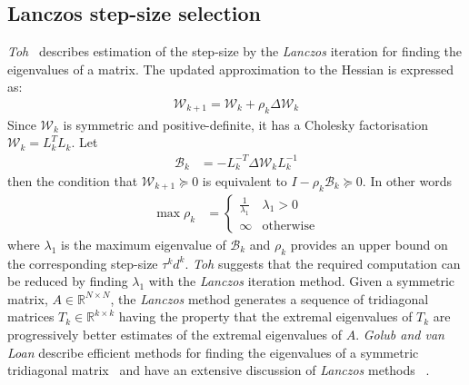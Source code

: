 \documentclass[a4paper,twoside,10pt,english]{report}
\begin{document}
\subsection{\label{sub:Lanczos-update}Lanczos step-size selection}
\emph{Toh}~\cite{Toh_NoteOnStepLengthsSemidefiniteProgramming} describes
estimation of the step-size by the \emph{Lanczos} iteration for
finding the eigenvalues of a matrix. The updated approximation to the Hessian
is expressed as:
\begin{align*}
\mathcal{W}_{k+1}=\mathcal{W}_{k}+\rho_{k}\Delta{}\mathcal{W}_{k}
\end{align*}
Since $\mathcal{W}_{k}$ is symmetric and positive-definite, it has a Cholesky 
factorisation $\mathcal{W}_{k}=L_{k}^{T}L_{k}$. Let
\begin{align*}
\mathcal{B}_{k} &= -L_{k}^{-T}\Delta{}\mathcal{W}_{k}L_{k}^{-1}
\end{align*}
then the condition that $\mathcal{W}_{k+1} \succeq 0$ is equivalent to
$I-\rho_{k}\mathcal{B}_{k} \succeq 0$. In other words
\begin{align*}
\max \rho_{k} &= 
\begin{cases}
\frac{1}{\lambda_{1}} & \lambda_{1} > 0\\
\infty & \text{otherwise}
\end{cases}
\end{align*}
where $\lambda_{1}$ is the maximum eigenvalue of $\mathcal{B}_{k}$ and $\rho_{k}$ 
provides an upper bound on the corresponding step-size $\tau^{k}d^{k}$.
\emph{Toh} suggests that the required computation can be reduced by finding
$\lambda_{1}$ with the \emph{Lanczos} iteration method. Given a symmetric 
matrix, $A\in\mathbb{R}^{N\times{}N}$, the \emph{Lanczos} method generates a
sequence of tridiagonal matrices $T_{k}\in\mathbb{R}^{k\times{}k}$ having the
property that the extremal eigenvalues of $T_{k}$ are progressively better
estimates of the extremal eigenvalues of $A$. \emph{Golub and van Loan}
describe efficient methods for finding the eigenvalues of a symmetric
tridiagonal matrix~\cite[Section 8.5]{GolubVanLoan_MatrixComputations} and
have an extensive discussion of \emph{Lanczos} methods 
~\cite[Chapter 9]{GolubVanLoan_MatrixComputations}.
\end{document}
